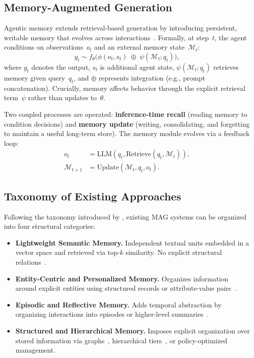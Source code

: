 \documentclass[11pt]{article}
\begin{document}
\subsection{Memory-Augmented Generation}

Agentic memory extends retrieval-based generation by introducing persistent, writable memory
that evolves across interactions~\citep{jiang2026anatomy}.
Formally, at step~$t$, the agent conditions on observations~$o_t$ and an external memory state~$\mathcal{M}_t$:
\begin{equation}
  y_t \sim f_\theta\!\Big(\phi(o_t, s_t) \;\oplus\; \psi(\mathcal{M}_t; q_t)\Big),
  \label{eq:mag}
\end{equation}
where $y_t$ denotes the output, $s_t$ is additional agent state,
$\psi(\mathcal{M}_t; q_t)$ retrieves memory given query~$q_t$,
and $\oplus$ represents integration (e.g., prompt concatenation).
Crucially, memory affects behavior through the explicit retrieval term~$\psi$
rather than updates to~$\theta$.

Two coupled processes are operated: \textbf{inference-time recall}
(reading memory to condition decisions) and \textbf{memory update}
(writing, consolidating, and forgetting to maintain a useful long-term store).
The memory module evolves via a feedback loop:
\begin{align}
  o_t &= \text{LLM}(q_t, \text{Retrieve}(q_t, \mathcal{M}_t)), \\
  \mathcal{M}_{t+1} &= \text{Update}(\mathcal{M}_t, q_t, o_t).
\end{align}

\subsection{Taxonomy of Existing Approaches}

Following the taxonomy introduced by \citet{jiang2026anatomy},
existing MAG systems can be organized into four structural categories:

\begin{itemize}[leftmargin=*]
  \item \textbf{Lightweight Semantic Memory.}
    Independent textual units embedded in a vector space and retrieved via top-$k$ similarity.
    No explicit structural relations~\citep{liu2026simplemem}.

  \item \textbf{Entity-Centric and Personalized Memory.}
    Organizes information around explicit entities using structured records
    or attribute-value pairs~\citep{xu2025amem,modarressi2023retllm,chhikara2025mem0}.

  \item \textbf{Episodic and Reflective Memory.}
    Adds temporal abstraction by organizing interactions into episodes
    or higher-level summaries~\citep{nan2025nemori}.

  \item \textbf{Structured and Hierarchical Memory.}
    Imposes explicit organization over stored information via
    graphs~\citep{jiang2026magma,rasmussen2025zep},
    hierarchical tiers~\citep{kang2025memoryos,packer2023memgpt},
    or policy-optimized management.
\end{itemize}
\end{document}

